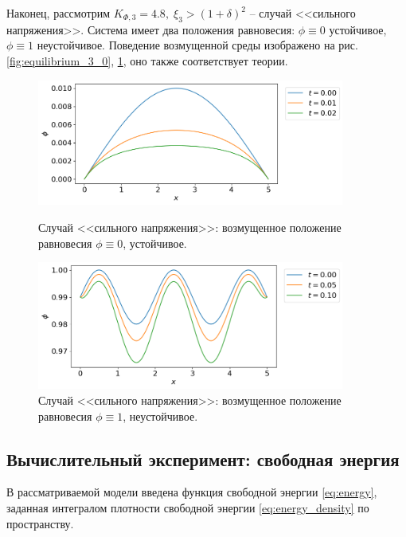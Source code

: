 Наконец, рассмотрим $K_{\Phi, 3} = 4.8, \; \xi_3 > (1 + \delta)^2$ -- случай <<сильного напряжения>>. Система имеет два положения равновесия: $\phi \equiv 0$ устойчивое, $\phi \equiv 1$ неустойчивое. Поведение возмущенной среды изображено на рис. \ref{fig:equilibrium_3_0}, \ref{fig:equilibrium_3_1}, оно также соответствует теории.

\begin{figure}[!t]
	\centering
	\includegraphics[width=0.9\textwidth]{figures/equilibrium_3_0.png}
	\vspace{-0.3cm}
	\caption{Случай <<сильного напряжения>>: возмущенное положение равновесия $\phi \equiv 0$, устойчивое.}
	\label{fig:equilibrium_3_0}
	\vspace{0.5cm}
	
	\includegraphics[width=0.9\textwidth]{figures/equilibrium_3_1.png}
	\vspace{-0.3cm}
	\caption{Случай <<сильного напряжения>>: возмущенное положение равновесия $\phi \equiv 1$, неустойчивое.}
	\label{fig:equilibrium_3_1}
\end{figure}


\subsection{Вычислительный эксперимент: свободная энергия}

В рассматриваемой модели введена функция свободной энергии \eqref{eq:energy}, заданная интегралом плотности свободной энергии \eqref{eq:energy_density} по пространству.


